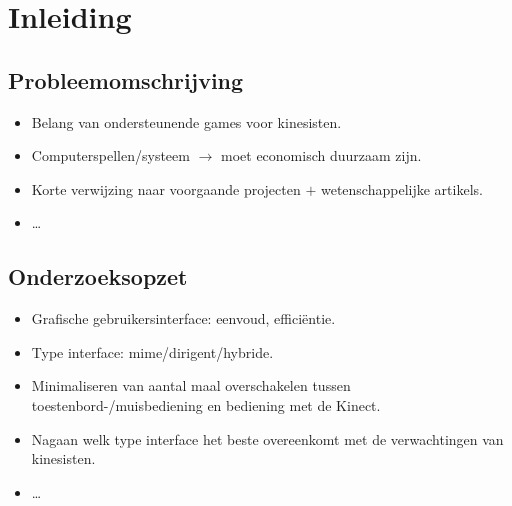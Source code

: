 \chapter{Inleiding}

\section{Probleemomschrijving}

\begin{itemize}
\item Belang van ondersteunende games voor kinesisten.
\item Computerspellen/systeem $\rightarrow$ moet economisch duurzaam zijn.
\item Korte verwijzing naar voorgaande projecten $+$ wetenschappelijke artikels.
\item \ldots
\end{itemize}


\section{Onderzoeksopzet}

\begin{itemize}
\item Grafische gebruikersinterface: eenvoud, effici\"entie.
\item Type interface: mime/dirigent/hybride.
\item Minimaliseren van aantal maal overschakelen tussen toestenbord-/muisbediening en bediening met de Kinect.
\item Nagaan welk type interface het beste overeenkomt met de verwachtingen van kinesisten.
\item \ldots
\end{itemize}